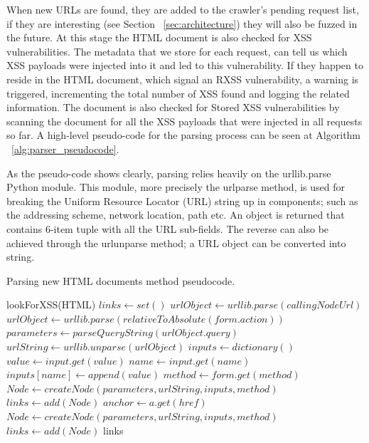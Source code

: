 When new URLs are found, they are added to the crawler's pending request list, if they are interesting (see Section ~\ref{sec:architecture}) they will also be fuzzed in the future. At this stage the HTML document is also checked for XSS vulnerabilities. The metadata that we store for each request, can tell us which XSS payloads were injected into it and led to this vulnerability. If they happen to reside in the HTML document, which signal an RXSS vulnerability, a warning is triggered, incrementing the total number of XSS found and logging the related information. The document is also checked for Stored XSS vulnerabilities by scanning the document for all the XSS payloads that were injected in all requests so far. A high-level pseudo-code for the parsing process can be seen at Algorithm ~\ref{alg:parser_pseudocode}. 

As the pseudo-code shows clearly, parsing relies heavily on the urllib.parse~\cite{urllib_parse} Python module. This module, more precisely the urlparse method, is used for breaking the Uniform Resource Locator (URL) string up in components; such as the addressing scheme, network location, path etc. An object is returned that contains 6-item tuple with all the URL sub-fields. The reverse can also be achieved through the urlunparse method; a URL object can be converted into string.

\begin{algorithm}
 
 \caption{Parsing new HTML documents method pseudocode.}
 \label{alg:parser_pseudocode}
 
 \begin{algorithmic}
	\STATE lookForXSS(HTML)  
	\STATE $links \leftarrow set()$ 
 			\STATE $urlObject \leftarrow urllib.parse(callingNodeUrl)$
		 \ELSE 
 			\STATE $urlObject \leftarrow urllib.parse(relativeToAbsolute(form.action))$
		 \ENDIF
		\STATE $parameters \leftarrow parseQueryString(urlObject.query)$ 
		\STATE $urlString \leftarrow urllib.unparse(urlObject)$ 
		\STATE $inputs \leftarrow dictionary()$ 
			\STATE $value \leftarrow input.get(value)$			 
	 		\STATE $name \leftarrow input.get(name)$	
	 		\STATE $inputs[name] \leftarrow append(value)$	 
		\ENDFOR
		\STATE $method \leftarrow form.get(method)$	
		\STATE $Node \leftarrow createNode(parameters, urlString, inputs, method)$	
		\STATE $links \leftarrow add(Node)$
			\STATE $anchor \leftarrow a.get(href)$			 
		\ENDFOR
		\STATE $Node \leftarrow createNode(parameters, urlString, inputs, method)$	
		\STATE $links \leftarrow add(Node)$
	\ENDFOR
	\RETURN links
 \end{algorithmic}
\end{algorithm}

